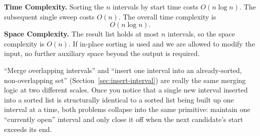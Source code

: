 \begin{complexitybox}
\textbf{Time Complexity.} Sorting the $n$ intervals by start time costs
$O(n \log n)$. The subsequent single sweep costs $O(n)$. The overall time
complexity is
\[
  O(n \log n).
\]
\textbf{Space Complexity.} The result list holds at most $n$ intervals, so
the space complexity is $O(n)$. If in-place sorting is used and we are
allowed to modify the input, no further auxiliary space beyond the output
is required.
\end{complexitybox}

\begin{takeawaybox}
``Merge overlapping intervals'' and ``insert one interval into an
already-sorted, non-overlapping set'' (Section~\ref{sec:insert-interval})
are really the same merging logic at two different scales. Once you notice
that a single new interval inserted into a sorted list is structurally
identical to a sorted list being built up one interval at a time, both
problems collapse into the same primitive: maintain one ``currently open''
interval and only close it off when the next candidate's start exceeds its
end.
\end{takeawaybox}
